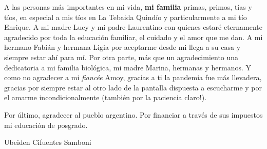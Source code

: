 A las personas más importantes en mi vida, \textbf{mi familia} primas, primos, tías y tíos, en especial a mis tíos en La Tebaida Quindío y particularmente a mi tío Enrique. A mi madre Lucy y mi padre Laurentino con quienes estaré eternamente agradecido por toda la educación familiar, el cuidado y el amor que me dan. A mi hermano Fabián y hermana Ligia por aceptarme desde mi llega a su casa y siempre estar ahí para mí. Por otra parte, más que un agradecimiento una dedicatoria a mi familia biológica, mi madre Marina, hermanas y hermanos. Y como no agradecer a mi \textit{fiancée} Amoy, gracias a ti la pandemia fue más llevadera, gracias por siempre estar al otro lado de la pantalla dispuesta a escucharme y por el amarme incondicionalmente (también por la paciencia \textexclamdown claro!).\\\vspace{-0.6cm}

Por último, agradecer al pueblo argentino. Por financiar a través de sus impuestos mi educación de posgrado.\\\vspace{1cm}

\begin{flushright}
Ubeiden Cifuentes Samboni
\end{flushright}
\endgroup